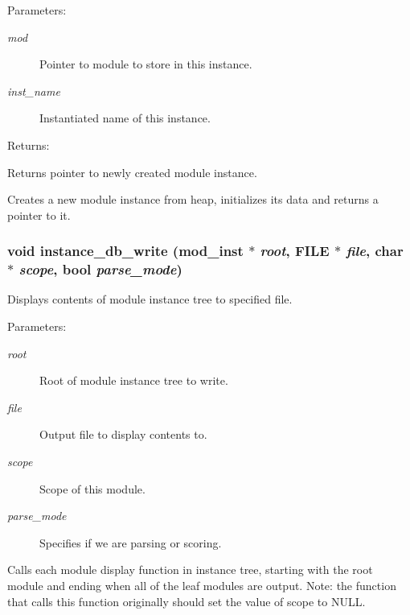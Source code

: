 \begin{Desc}
\item[Parameters: ]\par
\begin{description}
\item[{\em 
mod}]Pointer to module to store in this instance. \item[{\em 
inst\_\-name}]Instantiated name of this instance.\end{description}
\end{Desc}
\begin{Desc}
\item[Returns: ]\par
Returns pointer to newly created module instance.\end{Desc}
Creates a new module instance from heap, initializes its data and returns a pointer to it. 
\subsubsection{\setlength{\rightskip}{0pt plus 5cm}void instance\_\-db\_\-write ({\bf mod\_\-inst} $\ast$ {\em root}, FILE $\ast$ {\em file}, char $\ast$ {\em scope}, {\bf bool} {\em parse\_\-mode})}\label{instance_8c_a10}


Displays contents of module instance tree to specified file.

\begin{Desc}
\item[Parameters: ]\par
\begin{description}
\item[{\em 
root}]Root of module instance tree to write. \item[{\em 
file}]Output file to display contents to. \item[{\em 
scope}]Scope of this module. \item[{\em 
parse\_\-mode}]Specifies if we are parsing or scoring.\end{description}
\end{Desc}
Calls each module display function in instance tree, starting with the root module and ending when all of the leaf modules are output. Note: the function that calls this function originally should set the value of scope to NULL. 
